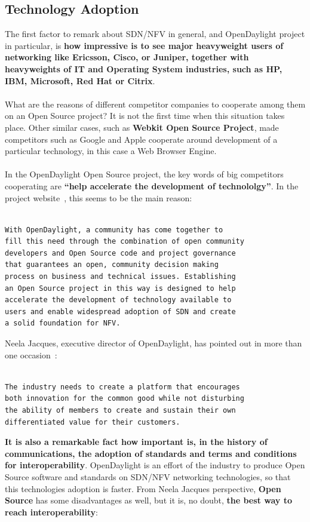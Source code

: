 \documentclass[a4paper, 12pt]{book}
\begin{document}
\subsection{Technology Adoption}
The first factor to remark about SDN/NFV in general, and OpenDaylight project in particular, is \textbf{how impressive is to see major heavyweight users of networking like Ericsson, Cisco, or Juniper, together with heavyweights of IT and Operating System industries, such as HP, IBM, Microsoft, Red Hat or Citrix}.\\
\\
What are the reasons of different competitor companies to cooperate among them on an Open Source project? It is not the first time when this situation takes place. Other similar cases, such as \textbf{Webkit Open Source Project}, made competitors such as Google and Apple cooperate around development of a particular technology, in this case a Web Browser Engine.\\
\\
In the OpenDaylight Open Source project, the key words of big competitors cooperating are \textbf{``help accelerate the development of technololgy''}. In the project website~\cite{OpenDaylightAbout}, this seems to be the main reason:
\begin{verbatim}

With OpenDaylight, a community has come together to
fill this need through the combination of open community
developers and Open Source code and project governance
that guarantees an open, community decision making
process on business and technical issues. Establishing
an Open Source project in this way is designed to help
accelerate the development of technology available to
users and enable widespread adoption of SDN and create
a solid foundation for NFV.

\end{verbatim}
Neela Jacques, executive director of OpenDaylight, has pointed out in more than one occasion~\cite{NFVZoneOpenDaylight}:
\begin{verbatim}

The industry needs to create a platform that encourages
both innovation for the common good while not disturbing
the ability of members to create and sustain their own
differentiated value for their customers.

\end{verbatim}
\textbf{It is also a remarkable fact how important is, in the history of communications, the adoption of standards and terms and conditions for interoperability}. OpenDaylight is an effort of the industry to produce Open Source software and standards on SDN/NFV networking technologies, so that this technologies adoption is faster. From Neela Jacques perspective, \textbf{Open Source} has some disadvantages as well, but it is, no doubt, \textbf{the best way to reach interoperability}:
\end{document}
